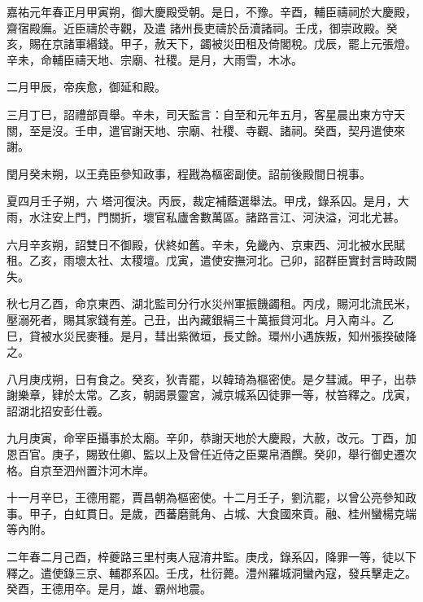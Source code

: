 \begin{pinyinscope}
 嘉祐元年春正月甲寅朔，御大慶殿受朝。是日，不豫。辛酉，輔臣禱祠於大慶殿，齋宿殿廡。近臣禱於寺觀，及遣
 諸州長吏禱於岳瀆諸祠。壬戌，御崇政殿。癸亥，賜在京諸軍緡錢。甲子，赦天下，蠲被災田租及倚閣稅。戊辰，罷上元張燈。辛未，命輔臣禱天地、宗廟、社稷。是月，大雨雪，木冰。



 二月甲辰，帝疾愈，御延和殿。



 三月丁巳，詔禮部貢舉。辛未，司天監言：自至和元年五月，客星晨出東方守天關，至是沒。壬申，遣官謝天地、宗廟、社稷、寺觀、諸祠。癸酉，契丹遣使來謝。



 閏月癸未朔，以王堯臣參知政事，程戡為樞密副使。詔前後殿間日視事。



 夏四月壬子朔，六
 塔河復決。丙辰，裁定補蔭選舉法。甲戌，錄系囚。是月，大雨，水注安上門，門關折，壞官私廬舍數萬區。諸路言江、河決溢，河北尤甚。



 六月辛亥朔，詔雙日不御殿，伏終如舊。辛未，免畿內、京東西、河北被水民賦租。乙亥，雨壞太社、太稷壇。戊寅，遣使安撫河北。己卯，詔群臣實封言時政闕失。



 秋七月乙酉，命京東西、湖北監司分行水災州軍振饑蠲租。丙戌，賜河北流民米，壓溺死者，賜其家錢有差。己丑，出內藏銀絹三十萬振貸河北。月入南斗。乙
 巳，貸被水災民麥種。是月，彗出紫微垣，長丈餘。環州小遇族叛，知州張揆破降之。



 八月庚戌朔，日有食之。癸亥，狄青罷，以韓琦為樞密使。是夕彗滅。甲子，出恭謝樂章，肄於太常。乙亥，朝謁景靈宮，減京城系囚徒罪一等，杖笞釋之。戊寅，詔湖北招安彭仕羲。



 九月庚寅，命宰臣攝事於太廟。辛卯，恭謝天地於大慶殿，大赦，改元。丁酉，加恩百官。庚子，賜致仕卿、監以上及曾任近侍之臣粟帛酒饌。癸卯，舉行御史遷次格。自京至泗州置汴河木岸。



 十一月辛巳，王德用罷，賈昌朝為樞密使。十二月壬子，劉沆罷，以曾公亮參知政事。甲子，白虹貫日。是歲，西蕃磨氈角、占城、大食國來貢。融、桂州蠻楊克端等內附。



 二年春二月己酉，梓夔路三里村夷人寇淯井監。庚戌，錄系囚，降罪一等，徒以下釋之。遣使錄三京、輔郡系囚。壬戌，杜衍薨。澧州羅城洞蠻內寇，發兵擊走之。癸酉，王德用卒。是月，雄、霸州地震。




\end{pinyinscope}
